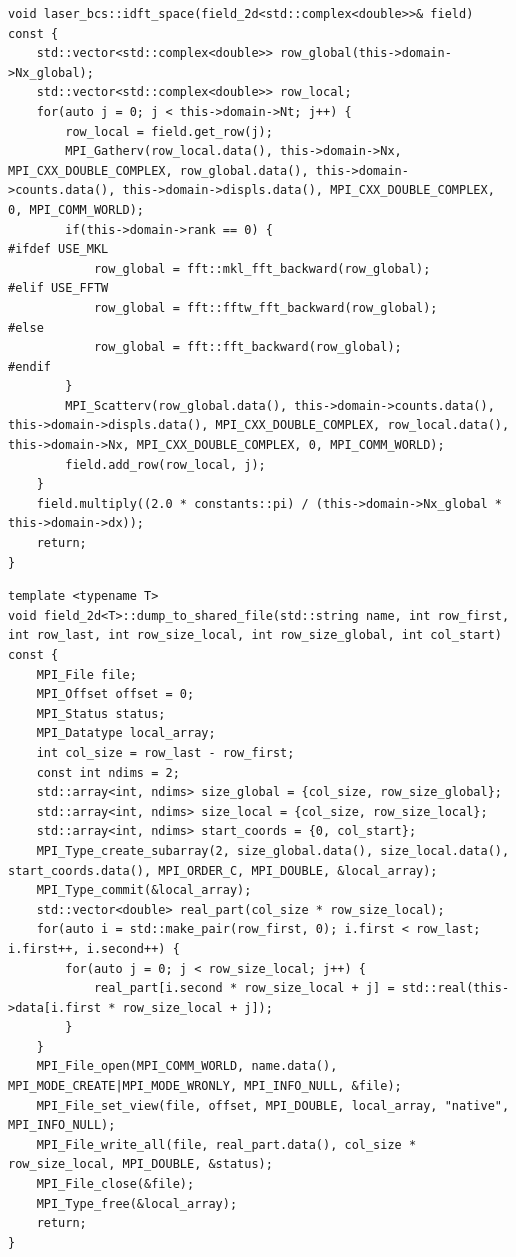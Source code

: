 \begin{lstlisting}[style=CXX, caption=Method for performing inverse discrete Fourier transform in space]
void laser_bcs::idft_space(field_2d<std::complex<double>>& field) const {
	std::vector<std::complex<double>> row_global(this->domain->Nx_global);
	std::vector<std::complex<double>> row_local;
	for(auto j = 0; j < this->domain->Nt; j++) {
		row_local = field.get_row(j);
		MPI_Gatherv(row_local.data(), this->domain->Nx, MPI_CXX_DOUBLE_COMPLEX, row_global.data(), this->domain->counts.data(), this->domain->displs.data(), MPI_CXX_DOUBLE_COMPLEX, 0, MPI_COMM_WORLD);
		if(this->domain->rank == 0) {
#ifdef USE_MKL
			row_global = fft::mkl_fft_backward(row_global);
#elif USE_FFTW
			row_global = fft::fftw_fft_backward(row_global);
#else
			row_global = fft::fft_backward(row_global);
#endif
		}
		MPI_Scatterv(row_global.data(), this->domain->counts.data(), this->domain->displs.data(), MPI_CXX_DOUBLE_COMPLEX, row_local.data(), this->domain->Nx, MPI_CXX_DOUBLE_COMPLEX, 0, MPI_COMM_WORLD);
		field.add_row(row_local, j);
	}
	field.multiply((2.0 * constants::pi) / (this->domain->Nx_global * this->domain->dx));
	return;
}
\end{lstlisting}

\begin{lstlisting}[style=CXX, caption=Method for dumping data into shared file]
template <typename T>
void field_2d<T>::dump_to_shared_file(std::string name, int row_first, int row_last, int row_size_local, int row_size_global, int col_start) const {
	MPI_File file;
	MPI_Offset offset = 0;
	MPI_Status status;
	MPI_Datatype local_array;
	int col_size = row_last - row_first;
	const int ndims = 2;
	std::array<int, ndims> size_global = {col_size, row_size_global};
	std::array<int, ndims> size_local = {col_size, row_size_local};
	std::array<int, ndims> start_coords = {0, col_start};
	MPI_Type_create_subarray(2, size_global.data(), size_local.data(), start_coords.data(), MPI_ORDER_C, MPI_DOUBLE, &local_array);
	MPI_Type_commit(&local_array);
	std::vector<double> real_part(col_size * row_size_local);
	for(auto i = std::make_pair(row_first, 0); i.first < row_last; i.first++, i.second++) {
		for(auto j = 0; j < row_size_local; j++) {
			real_part[i.second * row_size_local + j] = std::real(this->data[i.first * row_size_local + j]);
		}
	}
	MPI_File_open(MPI_COMM_WORLD, name.data(), MPI_MODE_CREATE|MPI_MODE_WRONLY, MPI_INFO_NULL, &file);
	MPI_File_set_view(file, offset, MPI_DOUBLE, local_array, "native", MPI_INFO_NULL);
	MPI_File_write_all(file, real_part.data(), col_size * row_size_local, MPI_DOUBLE, &status);
	MPI_File_close(&file);
	MPI_Type_free(&local_array);
	return;
}
\end{lstlisting}

